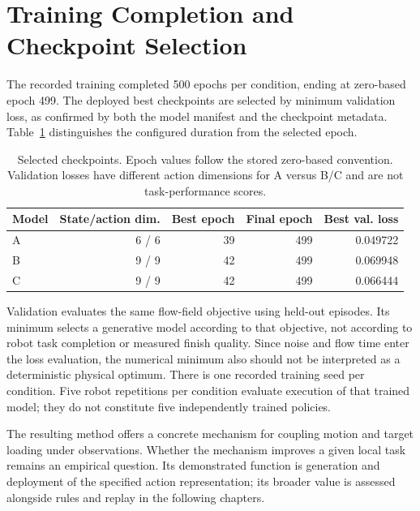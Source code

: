 \section{Training Completion and Checkpoint Selection}
The recorded training completed 500 epochs per condition, ending at zero-based epoch 499. The deployed best checkpoints are selected by minimum validation loss, as confirmed by both the model manifest and the checkpoint metadata. Table~\ref{tab:checkpoints} distinguishes the configured duration from the selected epoch.

\begin{table}[tbp]\centering\small
\caption[Selected checkpoint epochs]{Selected checkpoints. Epoch values follow the stored zero-based convention. Validation losses have different action dimensions for A versus B/C and are not task-performance scores.}
\label{tab:checkpoints}
\begin{tabular}{lrrrr}
\toprule Model & State/action dim. & Best epoch & Final epoch & Best val. loss \\ \midrule
A & 6 / 6 & 39 & 499 & 0.049722 \\
B & 9 / 9 & 42 & 499 & 0.069948 \\
C & 9 / 9 & 42 & 499 & 0.066444 \\
\bottomrule
\end{tabular}
\end{table}

Validation evaluates the same flow-field objective using held-out episodes. Its minimum selects a generative model according to that objective, not according to robot task completion or measured finish quality. Since noise and flow time enter the loss evaluation, the numerical minimum also should not be interpreted as a deterministic physical optimum. There is one recorded training seed per condition. Five robot repetitions per condition evaluate execution of that trained model; they do not constitute five independently trained policies.

The resulting method offers a concrete mechanism for coupling motion and target loading under observations. Whether the mechanism improves a given local task remains an empirical question. Its demonstrated function is generation and deployment of the specified action representation; its broader value is assessed alongside rules and replay in the following chapters.
